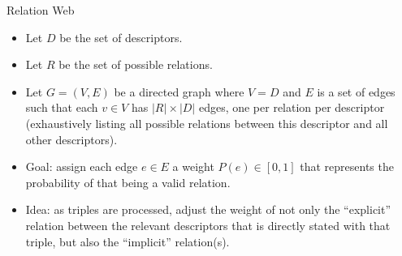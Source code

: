 \documentclass[a4paper]{article}
\begin{document}
Relation Web
\begin{itemize}
    \item Let $D$ be the set of descriptors.
    \item Let $R$ be the set of possible relations.
    \item Let $G = \left( V, E \right)$ be a directed graph where $V = D$ and
        $E$ is a set of edges such that each $v \in V$ has $|R| \times |D|$
        edges, one per relation per descriptor (exhaustively listing all 
        possible relations between this descriptor and all other descriptors).
    \item Goal: assign each edge $e \in E$ a weight $P(e) \in [0, 1]$ that
        represents the probability of that being a valid relation.
    \item Idea: as triples are processed, adjust the weight of not only the 
        ``explicit'' relation between the relevant descriptors that is directly
        stated with that triple, but also the ``implicit'' relation(s).
\end{itemize}
\end{document}
